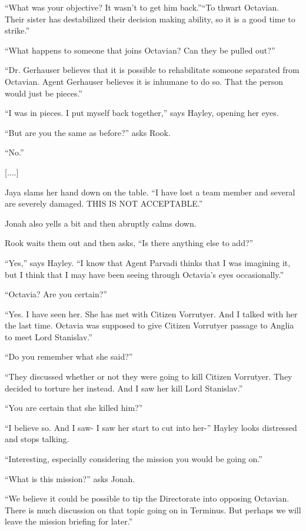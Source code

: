 ``What was your objective?  It wasn't to get him back.''``To thwart Octavian.  Their sister has destabilized their decision making ability, so it is a good time to strike.''

``What happens to someone that joins Octavian?  Can they be pulled out?''

``Dr. Gerhauser believes that it is possible to rehabilitate someone separated from Octavian.  Agent Gerhauser believes it is inhumane to do so.  That the person would just be pieces.''

``I was in pieces.  I put myself back together,'' says Hayley, opening her eyes.

``But are you the same as before?'' asks Rook.

``No.''

{[}....{]}

Jaya slams her hand down on the table.  ``I have lost a team member and several are severely damaged.  THIS IS NOT ACCEPTABLE.''

Jonah also yells a bit and then abruptly calms down.



Rook waits them out and then asks, ``Is there anything else to add?''

``Yes,'' says Hayley.  ``I know that Agent Parvadi thinks that I was imagining it, but I think that I may have been seeing through Octavia's eyes occasionally.''

``Octavia?  Are you certain?''

``Yes.  I have seen her.  She has met with Citizen Vorrutyer.  And I talked with her the last time.  Octavia was supposed to give Citizen Vorrutyer passage to Anglia to meet Lord Stanislav.''

``Do you remember what she said?''

``They discussed whether or not they were going to kill Citizen Vorrutyer.  They decided to torture her instead.  And I saw her kill Lord Stanislav.''

``You are certain that she killed him?''

``I believe so.  And I saw- I saw her start to cut into her-'' Hayley looks distressed and stops talking. 

``Interesting, especially considering the mission you would be going on.''

``What is this mission?'' asks Jonah.

``We believe it could be possible to tip the Directorate into opposing Octavian.  There is much discussion on that topic going on in Terminus.  But perhaps we will leave the mission briefing for later.''



